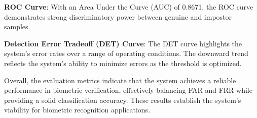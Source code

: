 \textbf{ROC Curve}: With an Area Under the Curve (AUC) of 0.8671, the ROC curve demonstrates strong discriminatory power between genuine and impostor samples.

\textbf{Detection Error Tradeoff (DET) Curve}: The DET curve highlights the system's error rates over a range of operating conditions. The downward trend reflects the system's ability to minimize errors as the threshold is optimized.

Overall, the evaluation metrics indicate that the system achieves a reliable performance in biometric verification, effectively balancing FAR and FRR while providing a solid classification accuracy. These results establish the system's viability for biometric recognition applications.
